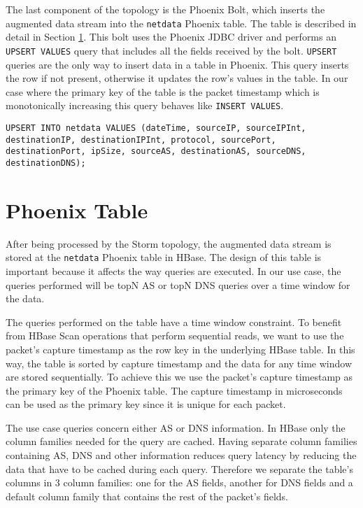 The last component of the topology is the Phoenix Bolt, which inserts the augmented data stream into the \texttt{netdata} Phoenix table. The table is described in detail in Section \ref{section:system_phoenix_table}. This bolt uses the Phoenix JDBC driver and performs an \texttt{UPSERT VALUES} query that includes all the fields received by the bolt. \texttt{UPSERT} queries are the only way to insert data in a table in Phoenix. This query inserts the row if not present, otherwise it updates the row's values in the table. In our case where the primary key of the table is the packet timestamp which is monotonically increasing this query behaves like \texttt{INSERT VALUES}.

\begin{lstlisting}[language=PhoenixSQL]
UPSERT INTO netdata VALUES (dateTime, sourceIP, sourceIPInt, destinationIP, destinationIPInt, protocol, sourcePort, destinationPort, ipSize, sourceAS, destinationAS, sourceDNS, destinationDNS);
\end{lstlisting}


\section{Phoenix Table}\label{section:system_phoenix_table}

After being processed by the Storm topology, the augmented data stream is stored at the \texttt{netdata} Phoenix table in HBase. The design of this table is important because it affects the way queries are executed. In our use case, the queries performed will be topN AS or topN DNS queries over a time window for the data. 

The queries performed on the table have a time window constraint. To benefit from HBase Scan operations that perform sequential reads, we want to use the packet's capture timestamp as the row key in the underlying HBase table. In this way, the table is sorted by capture timestamp and the data for any time window are stored sequentially. To achieve this we use the packet's capture timestamp as the primary key of the Phoenix table. The capture timestamp in microseconds can be used as the primary key since it is unique for each packet.

The use case queries concern either AS or DNS information. In HBase only the column families needed for the query are cached. Having separate column families containing AS, DNS and other information reduces query latency by reducing the data that have to be cached during each query. Therefore we separate the table's columns in 3 column families: one for the AS fields, another for DNS fields and a default column family that contains the rest of the packet's fields.

